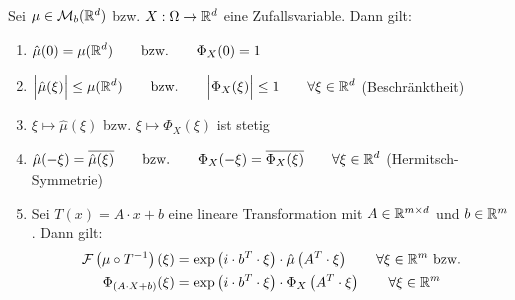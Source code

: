 \begin{theorem}\label{theorem6.1EigenschaftenDerFTCF}\enter
Sei $\mu\in\mathcal{M}_b(\mathbb{R}^d)$ bzw. $X:\Omega\to\mathbb{R}^d$ eine Zufallsvariable. Dann gilt:
\begin{enumerate}[label=(\alph*)]
\item $\begin{aligned}
\hat{\mu}(0)=\mu(\mathbb{R}^d)\qquad\text{bzw.}\qquad\Phi_X(0)=1
\end{aligned}$
\item $\begin{aligned}
\Big|\hat{\mu}(\xi)\Big|\leq\mu(\mathbb{R}^d)\qquad\text{bzw.}\qquad\Big|\Phi_X(\xi)\Big|\leq 1 \qquad\forall\xi\in\mathbb{R}^d
\end{aligned}$ (Beschränktheit)
\item $\xi\mapsto\hat{\mu}(\xi)$ bzw. $\xi\mapsto\Phi_X(\xi)$ ist stetig
\item $\begin{aligned}
\hat{\mu}(-\xi)=\overline{\hat{\mu}(\xi)}\qquad\text{bzw.}\qquad\Phi_X(-\xi)=\overline{\Phi_X(\xi)}\qquad\forall\xi\in\mathbb{R}^d
\end{aligned}$ (Hermitsch-Symmetrie)
\item Sei $T(x)=A\cdot x+b$ eine lineare Transformation mit $A\in\mathbb{R}^{m\times d}$ und $b\in\mathbb{R}^m$. Dann gilt:
\begin{align*}
\mathcal{F}\left(\mu\circ T^{-1}\right)(\xi)&=\exp\left(i\cdot b^T\cdot\xi\right)\cdot\hat{\mu}\left(A^T\cdot\xi\right)\qquad\forall\xi\in\mathbb{R}^m\text{ bzw.}\\
\Phi_{(A\cdot X+b)}(\xi)
&=\exp\left(i\cdot b^T\cdot\xi\right)\cdot\Phi_X\left(A^T\cdot\xi\right)\qquad\forall\xi\in\mathbb{R}^m
\end{align*}
\end{enumerate}
\end{theorem}

